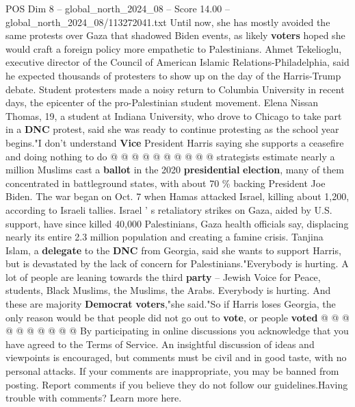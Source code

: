 \begin{textsample}{POS Dim 8 – global\_north\_2024\_08 – Score 14.00 – global\_north\_2024\_08/113272041.txt}
Until now, she has mostly avoided the same protests over Gaza that shadowed Biden events, as likely \textbf{voters} hoped she would craft a foreign policy more empathetic to Palestinians.
Ahmet Tekelioglu, executive director of the Council of American Islamic Relations-Philadelphia, said he expected thousands of protesters to show up on the day of the Harris-Trump debate.
Student protesters made a noisy return to Columbia University in recent days, the epicenter of the pro-Palestinian student movement.
Elena Nissan Thomas, 19, a student at Indiana University, who drove to Chicago to take part in a \textbf{DNC} protest, said she was ready to continue protesting as the school year begins."I don't understand \textbf{Vice} President Harris saying she supports a ceasefire and doing nothing to do @ @ @ @ @ @ @ @ @ @ strategists estimate nearly a million Muslims cast a \textbf{ballot} in the 2020 \textbf{presidential} \textbf{election}, many of them concentrated in battleground states, with about 70 \% backing President Joe Biden.
The war began on Oct. 7 when Hamas attacked Israel, killing about 1,200, according to Israeli tallies.
Israel ' s retaliatory strikes on Gaza, aided by U.S. support, have since killed 40,000 Palestinians, Gaza health officials say, displacing nearly its entire 2.3 million population and creating a famine crisis.
Tanjina Islam, a \textbf{delegate} to the \textbf{DNC} from Georgia, said she wants to support Harris, but is devastated by the lack of concern for Palestinians."Everybody is hurting.
A lot of people are leaning towards the third \textbf{party} -- Jewish Voice for Peace, students, Black Muslims, the Muslims, the Arabs.
Everybody is hurting.
And these are majority \textbf{Democrat} \textbf{voters},"she said."So if Harris loses Georgia, the only reason would be that people did not go out to \textbf{vote}, or people \textbf{voted} @ @ @ @ @ @ @ @ @ @ By participating in online discussions you acknowledge that you have agreed to the Terms of Service.
An insightful discussion of ideas and viewpoints is encouraged, but comments must be civil and in good taste, with no personal attacks.
If your comments are inappropriate, you may be banned from posting.
Report comments if you believe they do not follow our guidelines.Having trouble with comments?
Learn more here.

\end{textsample}
